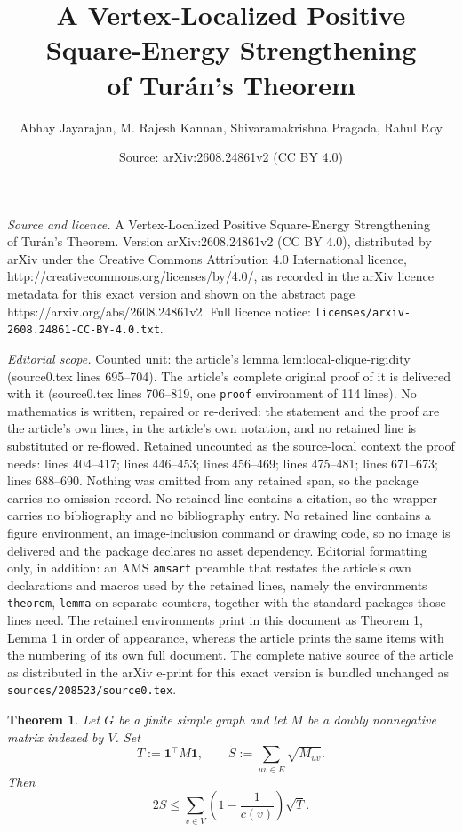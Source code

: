 \documentclass[10pt,a4paper]{amsart}
\title{A Vertex-Localized Positive Square-Energy Strengthening\\ of Tur\'an's Theorem}
\author{Abhay Jayarajan, M. Rajesh Kannan, Shivaramakrishna Pragada, Rahul Roy}
\date{Source: arXiv:2608.24861v2 (CC BY 4.0)}
\newtheorem{theorem}{Theorem}
\newcommand{\one}{\mathbf 1}
\begin{document}
\maketitle

\noindent\emph{Source and licence.} A Vertex-Localized Positive Square-Energy Strengthening\\ of Tur\'an's Theorem. Version arXiv:2608.24861v2 (CC BY 4.0), distributed by arXiv under the Creative Commons Attribution 4.0 International licence, http://creativecommons.org/licenses/by/4.0/, as recorded in the arXiv licence metadata for this exact version and shown on the abstract page https://arxiv.org/abs/2608.24861v2. Full licence notice: \texttt{licenses/arxiv-2608.24861-CC-BY-4.0.txt}.\par\smallskip

\noindent\textit{Editorial scope.} Counted unit: the article's lemma lem:local-clique-rigidity (source0.tex lines 695--704). The article's complete original proof of it is delivered with it (source0.tex lines 706--819, one \texttt{proof} environment of 114 lines). No mathematics is written, repaired or re-derived: the statement and the proof are the article's own lines, in the article's own notation, and no retained line is substituted or re-flowed.  Retained uncounted as the source-local context the proof needs: lines 404--417; lines 446--453; lines 456--469; lines 475--481; lines 671--673; lines 688--690.  Nothing was omitted from any retained span, so the package carries no omission record.  No retained line contains a citation, so the wrapper carries no bibliography and no bibliography entry.  No retained line contains a figure environment, an image-inclusion command or drawing code, so no image is delivered and the package declares no asset dependency.  Editorial formatting only, in addition: an AMS \texttt{amsart} preamble that restates the article's own declarations and macros used by the retained lines, namely the environments \texttt{theorem}, \texttt{lemma} on separate counters, together with the standard packages those lines need.  The retained environments print in this document as Theorem 1, Lemma 1 in order of appearance, whereas the article prints the same items with the numbering of its own full document.  The complete native source of the article as distributed in the arXiv e-print for this exact version is bundled unchanged as \texttt{sources/208523/source0.tex}.
	\begin{theorem}
		\label{thm:localized-DNN}
		Let $G$ be a finite simple graph and let $M$ be a doubly nonnegative
		matrix indexed by $V$.  Set
		\[
		T:=\one^{\top}M\one,
		\qquad
		S:=\sum_{uv\in E}\sqrt{M_{uv}}.
		\]
		Then
		\begin{equation}\label{eq:localized-DNN}
			2S\leq \sum_{v\in V}\left(1-\frac1{c(v)}\right)\sqrt{T}.
		\end{equation}
	\end{theorem}
\end{document}
